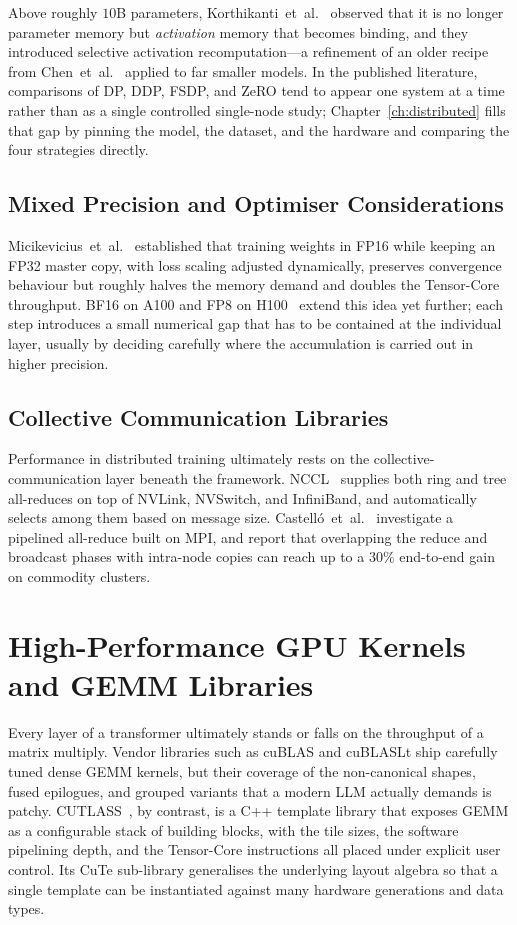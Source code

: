 Above roughly $10$B parameters, Korthikanti~et~al.\
\cite{korthikanti2022activation} observed that it is no longer
parameter memory but \emph{activation} memory that becomes binding,
and they introduced selective activation recomputation---a
refinement of an older recipe from
Chen~et~al.~\cite{chen2016training} applied to far smaller models.
In the published literature, comparisons of DP, DDP, FSDP, and ZeRO
tend to appear one system at a time rather than as a single
controlled single-node study; Chapter~\ref{ch:distributed} fills that
gap by pinning the model, the dataset, and the hardware and
comparing the four strategies directly.

\subsection{Mixed Precision and Optimiser
Considerations}\label{sec:lit_mp_amp}
Micikevicius~et~al.~\cite{micikevicius2018amp} established that
training weights in FP16 while keeping an FP32 master copy, with
loss scaling adjusted dynamically, preserves convergence behaviour
but roughly halves the memory demand and doubles the Tensor-Core
throughput. BF16 on A100 and FP8 on H100~\cite{nvidia_hopper} extend
this idea yet further; each step introduces a small numerical gap
that has to be contained at the individual layer, usually by
deciding carefully where the accumulation is carried out in higher
precision.

\subsection{Collective Communication Libraries}\label{sec:lit_nccl}
Performance in distributed training ultimately rests on the
collective-communication layer beneath the framework. NCCL~\cite{nccl}
supplies both ring and tree all-reduces on top of NVLink, NVSwitch,
and InfiniBand, and automatically selects among them based on
message size. Castell{\'o}~et~al.~\cite{castello2021accelerating}
investigate a pipelined all-reduce built on MPI, and report that
overlapping the reduce and broadcast phases with intra-node copies
can reach up to a $30\%$ end-to-end gain on commodity clusters.

\section{High-Performance GPU Kernels and GEMM Libraries}\label{sec:lit_gemm}

Every layer of a transformer ultimately stands or falls on the
throughput of a matrix multiply. Vendor libraries such as cuBLAS and
cuBLASLt ship carefully tuned dense GEMM kernels, but their coverage
of the non-canonical shapes, fused epilogues, and grouped variants
that a modern LLM actually demands is patchy. CUTLASS~\cite{cutlass},
by contrast, is a C++ template library that exposes GEMM as a
configurable stack of building blocks, with the tile sizes, the
software pipelining depth, and the Tensor-Core instructions all
placed under explicit user control. Its CuTe sub-library generalises
the underlying layout algebra so that a single template can be
instantiated against many hardware generations and data types.


